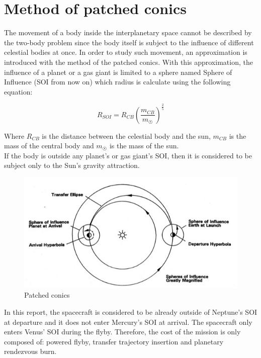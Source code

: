 \documentclass[11pt,a4paper]{report}
\begin{document}
\section{Method of patched conics}
The movement of a body inside the interplanetary space cannot be described by the two-body problem since the body itself is subject to the influence of different celestial bodies at once.
In order to study such movement, an approximation is introduced with the method of the patched conics. With this approximation, the influence of a planet or a gas giant is limited to a sphere named Sphere of Influence (SOI from now on) which radius is calculate using the following equation:

\begin{equation*}
    R_{SOI} = R_{CB}\left(\frac{m_{CB}}{m_{\astrosun}}\right)^{\frac{2}{5}}
\end{equation*}

Where $R_{CB}$ is the distance between the celestial body and the sun, $m_{CB}$ is the mass of the central body and $m_{\astrosun}$ is the mass of the sun.\\ 
If the body is outside any planet’s or gas giant’s SOI, then it is considered to be subject only to the Sun’s gravity attraction.\\

\begin{figure}[H]
\includegraphics[width = \textwidth]{patched_conics.jpg}
\caption{Patched conics}
\end{figure}

In this report, the spacecraft is considered to be already outside of Neptune’s SOI at departure and it does not enter Mercury’s SOI at arrival. The spacecraft only enters Venus’ SOI during the flyby. Therefore, the cost of the mission is only composed of: powered flyby, transfer trajectory insertion and planetary rendezvous burn.
\end{document}
